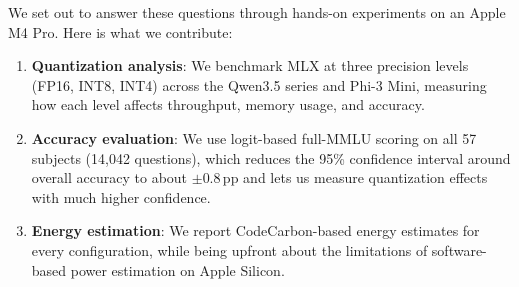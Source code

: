 \documentclass[journal]{IEEEtran}
\begin{document}
We set out to answer these questions through hands-on experiments on an Apple M4 Pro. Here is what we contribute:

\begin{enumerate}[leftmargin=*,nosep]
    \item \textbf{Quantization analysis}: We benchmark MLX at three precision levels (FP16, INT8, INT4) across the Qwen3.5 series and Phi-3 Mini, measuring how each level affects throughput, memory usage, and accuracy.

    \item \textbf{Accuracy evaluation}: We use logit-based full-MMLU scoring on all 57 subjects (14,042 questions), which reduces the 95\% confidence interval around overall accuracy to about $\pm 0.8$\,pp and lets us measure quantization effects with much higher confidence.

    \item \textbf{Energy estimation}: We report CodeCarbon-based energy estimates for every configuration, while being upfront about the limitations of software-based power estimation on Apple Silicon.
\end{enumerate}
\end{document}
